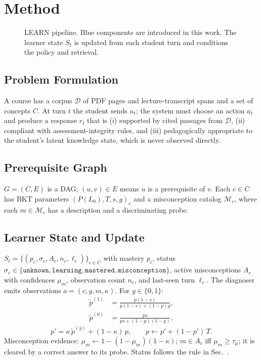 \section{Method}
\begin{figure}[t]
\centering
\resizebox{0.85\textwidth}{!}{}
\caption{LEARN pipeline. Blue components are introduced in this work. The learner state $S_t$ is updated from each student turn and conditions the policy and retrieval.}
\label{fig:arch}
\end{figure}

\subsection{Problem Formulation}
A course has a corpus $\mathcal{D}$ of PDF pages and lecture-transcript spans and a set of concepts $C$. At turn $t$ the student sends $u_t$; the system must choose an action $a_t$ and produce a response $r_t$ that is (i) supported by cited passages from $\mathcal{D}$, (ii) compliant with assessment-integrity rules, and (iii) pedagogically appropriate to the student's latent knowledge state, which is never observed directly.

\subsection{Prerequisite Graph}
$G=(C,E)$ is a DAG; $(u,v)\in E$ means $u$ is a prerequisite of $v$. Each $c\in C$ has BKT parameters $(P(L_0),T,s,g)_c$ and a misconception catalog $\mathcal{M}_c$, where each $m\in\mathcal{M}_c$ has a description and a discriminating probe. 

\subsection{Learner State and Update}
$S_t=\{(p_c,\sigma_c,A_c,n_c,\ell_c)\}_{c\in C}$ with mastery $p_c$, status $\sigma_c\in\{\texttt{unknown},\texttt{learning},\texttt{mastered},\texttt{misconception}\}$, active misconceptions $A_c$ with confidences $\mu_m$, observation count $n_c$, and last-seen turn $\ell_c$. The diagnoser emits observations $o=(c,y,m,\kappa)$. For $y\in\{0,1\}$:
\begin{align}
\tilde p^{(1)}&=\frac{p(1-s)}{p(1-s)+(1-p)g},\\
\tilde p^{(0)}&=\frac{ps}{ps+(1-p)(1-g)},
\end{align}
\begin{equation}
p'=\kappa\,\tilde p^{(y)}+(1-\kappa)\,p,\qquad p\leftarrow p'+(1-p')\,T.
\end{equation}
Misconception evidence: $\mu_m\leftarrow 1-(1-\mu_m)(1-\kappa)$; $m\in A_c$ iff $\mu_m\ge\tau_\mu$; it is cleared by a correct answer to its probe. Status follows the rule in Sec.~.

